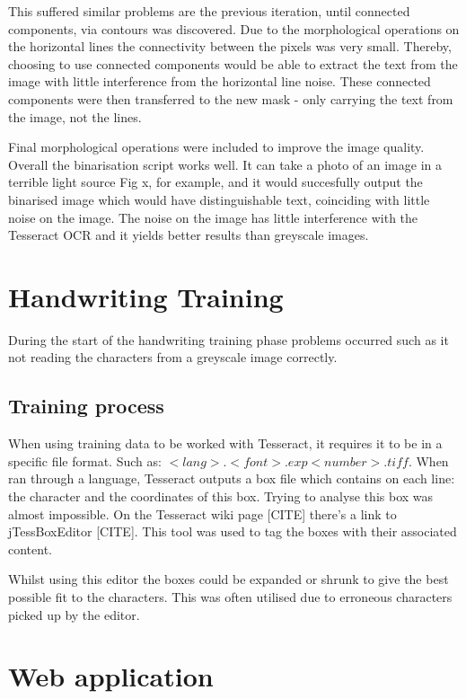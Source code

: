 This suffered similar problems are the previous iteration, until connected components, via contours was discovered. Due to the morphological operations on the horizontal lines the connectivity between the pixels was very small. Thereby, choosing to use connected components would be able to extract the text from the image with little interference from the horizontal line noise. These connected components were then transferred to the new mask - only carrying the text from the image, not the lines.

Final morphological operations were included to improve the image quality. Overall the binarisation script works well.  It can take a photo of an image in a terrible light source Fig x, for example, and it would succesfully output the binarised image which would have distinguishable text, coinciding with little noise on the image. The noise on the image has little interference with the Tesseract OCR and it yields better results than greyscale images.

\section{Handwriting Training}
During the start of the handwriting training phase problems occurred such as it not reading the characters from a greyscale image correctly.
\subsection{Training process}
When using training data to be worked with Tesseract, it requires it to be in a specific file format. Such as: $<lang>.<font>.exp<number>.tiff$. When ran through a language, Tesseract outputs a box file which contains on each line: the character and the coordinates of this box. Trying to analyse this box was almost impossible. On the Tesseract wiki page [CITE] there's a link to jTessBoxEditor [CITE]. This tool was used to tag the boxes with their associated content.

Whilst using this editor the boxes could be expanded or shrunk to give the best possible fit to the characters. This was often utilised due to erroneous characters picked up by the editor.





\section{Web application}

